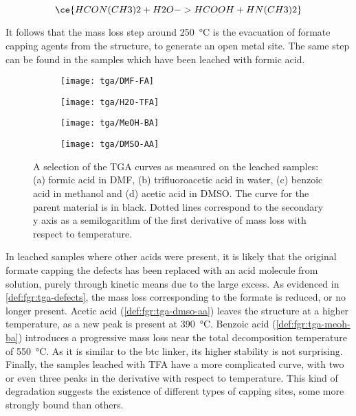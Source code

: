 \begin{equation}\label{def:eqn:dmf-hydrolysis}
    \ce{HCON(CH3)2 + H2O -> HCOOH + HN(CH3)2}
\end{equation}

It follows that the mass loss step around \SI{250}{\degreeCelsius}
is the evacuation of formate capping agents from the 
structure, to generate an open metal site. The same step
can be found in the samples which have been leached with
formic acid.

\begin{figure}[htbp]
    \centering

    \begin{subfigure}{0.45\linewidth}
        \texttt{[image: tga/DMF-FA]}%
		\caption{}%
        \label{def:fgr:tga-dmf-fa}
    \end{subfigure}
    \begin{subfigure}{0.45\linewidth}
        \texttt{[image: tga/H2O-TFA]}%
		\caption{}%
        \label{def:fgr:tga-h2o-tfa}
    \end{subfigure}

    
    \begin{subfigure}{0.45\linewidth}
        \texttt{[image: tga/MeOH-BA]}%
		\caption{}%
        \label{def:fgr:tga-meoh-ba}
    \end{subfigure}
    \begin{subfigure}{0.45\linewidth}
        \texttt{[image: tga/DMSO-AA]}%
		\caption{}%
        \label{def:fgr:tga-dmso-aa}
    \end{subfigure}

    \caption{A selection of the TGA curves as measured on the
    leached samples: (a) formic acid in DMF, (b) trifluoroacetic
    acid in water, (c) benzoic acid in methanol and (d) acetic acid
    in DMSO. The curve for the parent material is in black. 
    Dotted lines correspond to the secondary y axis as a 
    semilogarithm of the first derivative of mass loss with 
    respect to temperature.}%
    \label{def:fgr:tga-dataset}
\end{figure}

In leached samples where other acids were present,
it is likely that the original formate capping the defects 
has been replaced with an acid molecule from solution,
purely through kinetic means due to the large excess.
As evidenced in \autoref{def:fgr:tga-defects}, the mass 
loss corresponding to the formate is reduced, or no longer present. 
Acetic acid (\autoref{def:fgr:tga-dmso-aa}) leaves the 
structure at a higher temperature, as 
a new peak is present at \SI{390}{\degreeCelsius}.
Benzoic acid (\autoref{def:fgr:tga-meoh-ba}) introduces a progressive 
mass loss near the total decomposition temperature of \SI{550}{\degreeCelsius}.
As it is similar to the btc linker, its higher stability
is not surprising. Finally, the samples leached with 
TFA have a more complicated curve, with two or even 
three peaks in the derivative with respect to temperature.
This kind of degradation suggests the existence of different types
of capping sites, some more strongly bound than others. 

